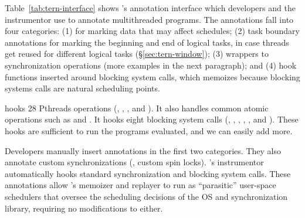 Table~\ref{tab:tern-interface} shows \tern's annotation interface which
developers and the instrumentor use to annotate multithreaded programs.
The annotations fall into four categories: (1)  for marking
data that may affect schedules; (2) task boundary annotations for marking
the beginning and end of logical tasks, in case threads get reused for
different logical tasks (\S\ref{sec:tern-window}); (3) wrappers to
synchronization operations (more examples in the next paragraph); and (4) hook
functions inserted around blocking system calls, which \tern memoizes
because blocking systems calls are natural scheduling points.

\tern hooks 28 Pthreads operations (\eg, ,
, and ).  It also handles
common atomic operations such as  and .
It hooks eight blocking system calls (\eg, , ,
, , and ). These hooks are sufficient to
run the programs evaluated, and we can easily add more.

Developers manually insert annotations in the first two categories.  They
also annotate custom synchronizations (\eg, custom spin locks).  \tern's
instrumentor automatically hooks standard synchronization and blocking
system calls.  These annotations allow \tern's memoizer and replayer to run
as ``parasitic'' user-space schedulers that oversee the scheduling
decisions of the OS and synchronization library, requiring no
modifications to either.











